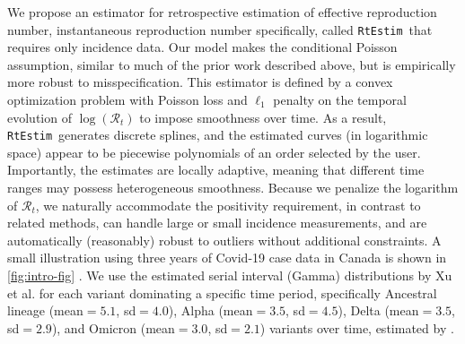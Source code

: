 \documentclass[10pt,letterpaper]{article}
\def\RtEstim{\texttt{RtEstim}}
\def\calR{\mathcal{R}}
\newcommand{\citep}[1]{\cite{#1}}
\begin{document}
We propose an estimator for retrospective estimation of effective reproduction number, 
instantaneous reproduction number specifically,  
called \RtEstim\ that requires only incidence data. Our model makes the
conditional Poisson assumption, similar to much of the prior work described
above, but is empirically more robust to misspecification. This estimator is 
defined by a convex optimization problem with Poisson loss and $\ell_1$ penalty 
on the temporal evolution of $\log(\calR_t)$ to impose smoothness over time. 
As a result, \RtEstim\ generates discrete splines, and the estimated curves (in
logarithmic space) appear to be piecewise polynomials of an order selected by the
user. Importantly, the estimates are locally adaptive, meaning that different
time ranges may possess heterogeneous smoothness. Because we penalize the
logarithm of $\calR_t$, we naturally accommodate the positivity requirement, in
contrast to related methods, can
handle large or small incidence measurements, and are automatically (reasonably)
robust to outliers without additional constraints. A small illustration using
three years of Covid-19 case data in Canada is shown in \autoref{fig:intro-fig} \citep{CovidTimelineCanada}. 
We use the estimated serial interval (Gamma) distributions by Xu et al. \citep{xu2023assessing} for 
each variant dominating a specific time period, specifically Ancestral lineage 
(mean$=5.1 $, sd$=4.0$), Alpha (mean$=3.5$, sd$=4.5$), Delta (mean$=3.5$, sd$=2.9$), 
and Omicron (mean$=3.0$, sd$=2.1$) variants over time, estimated by \cite{duotang_2023}.
\end{document}
